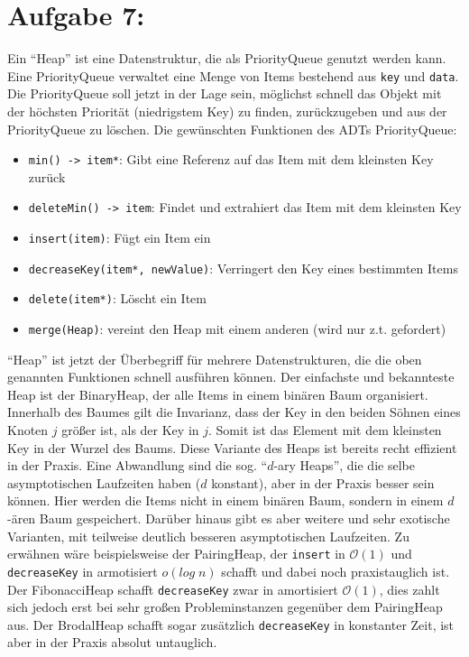 \documentclass[11pt]{scrartcl} %
\newcommand{\func}[1]{\mbox{\texttt{#1}}}
\begin{document}
\section*{Aufgabe 7:}
Ein \enquote{Heap} ist eine Datenstruktur, die als PriorityQueue genutzt werden kann. Eine PriorityQueue verwaltet eine Menge von Items bestehend aus \func{key} und \func{data}. Die PriorityQueue soll jetzt in der Lage sein, möglichst schnell das Objekt mit der höchsten Priorität (niedrigstem Key) zu finden, zurückzugeben und aus der PriorityQueue zu löschen. Die gewünschten Funktionen des ADTs PriorityQueue:
\begin{itemize}
\item \func{min() -> item*}: Gibt eine Referenz auf das Item mit dem kleinsten Key zurück
\item \func{deleteMin() -> item}: Findet und extrahiert das Item mit dem kleinsten Key
\item \func{insert(item)}: Fügt ein Item ein
\item \func{decreaseKey(item*, newValue)}: Verringert den Key eines bestimmten Items
\item \func{delete(item*)}: Löscht ein Item
\item \func{merge(Heap)}: vereint den Heap mit einem anderen (wird nur z.t. gefordert) 
\end{itemize}
\enquote{Heap} ist jetzt der Überbegriff für mehrere Datenstrukturen, die die oben genannten Funktionen schnell ausführen können.
Der einfachste und bekannteste Heap ist der BinaryHeap, der alle Items in einem binären Baum organisiert. Innerhalb des Baumes gilt die Invarianz, dass der Key in den beiden Söhnen eines Knoten $j$ größer ist, als der Key in $j$. Somit ist das Element mit dem kleinsten Key in der Wurzel des Baums. Diese Variante des Heaps ist bereits recht effizient in der Praxis. Eine Abwandlung sind die sog. \enquote{$d$-ary Heaps}, die die selbe asymptotischen Laufzeiten haben ($d$ konstant), aber in der Praxis besser sein können. Hier werden die Items nicht in einem binären Baum, sondern in einem $d$-ären Baum gespeichert.
Darüber hinaus gibt es aber weitere und sehr exotische Varianten, mit teilweise deutlich besseren asymptotischen Laufzeiten. Zu erwähnen wäre beispielsweise der PairingHeap, der \func{insert} in $\mathcal O(1)$ und \func{decreaseKey} in armotisiert $o(log\;n)$ schafft und dabei noch praxistauglich ist. Der FibonacciHeap schafft \func{decreaseKey} zwar in amortisiert $\mathcal O(1)$, dies zahlt sich jedoch erst bei sehr großen Probleminstanzen gegenüber dem PairingHeap aus. Der BrodalHeap schafft sogar zusätzlich \func{decreaseKey} in konstanter Zeit, ist aber in der Praxis absolut untauglich.
\end{document}

